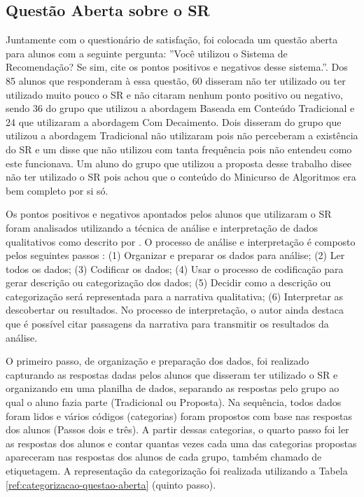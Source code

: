 \subsection{Questão Aberta sobre o SR}\label{subsection:questao-aberta}

Juntamente com o questionário de satisfação, foi colocada um questão aberta para alunos com a seguinte pergunta:
''Você utilizou o Sistema de Recomendação? Se sim, cite os pontos positivos e negativos desse sistema.''. Dos 85 alunos
que responderam à essa questão, 60 disseram não ter utilizado ou ter utilizado muito pouco o SR
e não citaram nenhum ponto positivo ou negativo, sendo 36 do grupo que utilizou a abordagem Baseada em Conteúdo Tradicional
e 24 que utilizaram a abordagem Com Decaimento. Dois disseram do grupo que utilizou a abordagem Tradicional
não utilizaram pois não perceberam a existência do SR e um disse que não utilizou com tanta frequência
pois não entendeu como este funcionava. Um aluno do grupo que utilizou a proposta desse trabalho disee não ter utilizado
o SR pois achou que o conteúdo do Minicurso de Algoritmos era bem completo por si só.

Os pontos positivos e negativos apontados pelos alunos que utilizaram o SR foram analisados utilizando a técnica de análise
e interpretação de dados qualitativos como descrito por . O processo de análise e interpretação
é composto pelos seguintes passos \cite{creswell1994research}: (1) Organizar e preparar os dados para análise;
(2) Ler todos os dados; (3) Codificar os dados; (4) Usar o processo de codificação para gerar descrição ou categorização
dos dados; (5) Decidir como a descrição ou categorização será representada para a narrativa qualitativa; (6) Interpretar
as descobertar ou resultados. No processo de interpretação, o autor ainda destaca que é possível citar passagens da narrativa
para transmitir os resultados da análise.

O primeiro passo, de organização e preparação dos dados, foi realizado capturando as respostas dadas pelos alunos que disseram
ter utilizado o SR e organizando em uma planilha de dados, separando as respostas pelo grupo ao qual o aluno fazia parte
(Tradicional ou Proposta). Na sequência, todos dados foram lidos e vários códigos (categorias) foram propostos com base
nas respostas dos alunos (Passos dois e três). A partir dessas categorias, o quarto passo foi ler as respostas dos alunos
e contar quantas vezes cada uma das categorias propostas apareceram nas respostas dos alunos de cada grupo, também
chamado de etiquetagem. A representação da categorização foi realizada utilizando a Tabela \ref{ref:categorizacao-questao-aberta} (quinto passo).

